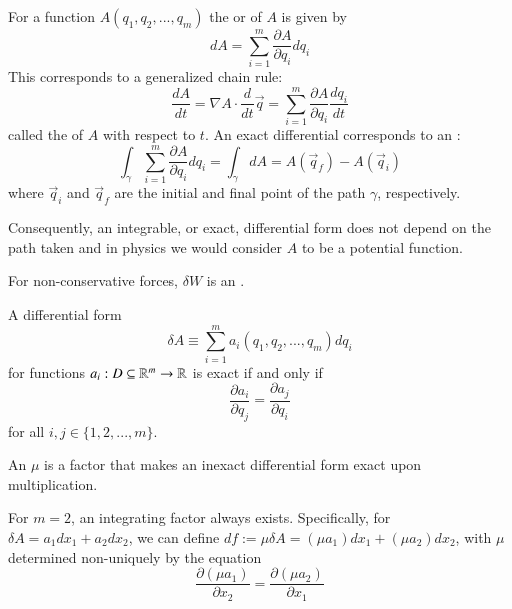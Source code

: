 \documentclass[12pt, a4paper, oneside, openright, titlepage]{book}
\begin{document}
\begin{defn}
    For a function $A(q_1,q_2,...,q_m)$ the  or  of $A$ is given by \begin{equation*}
        dA = \sum_{i=1}^m\frac{\partial A}{\partial q_i}dq_i
    \end{equation*}
    This corresponds to a generalized chain rule: \begin{equation*}
        \frac{dA}{dt} = \nabla A\cdot \frac{d}{dt}\vec{q} = \sum_{i=1}^m\frac{\partial A}{\partial q_i}\frac{dq_i}{dt}
    \end{equation*}
    called the  of $A$ with respect to $t$. An exact differential corresponds to an : \begin{equation*}
        \int_{\gamma}\sum_{i=1}^m\frac{\partial A}{\partial q_i}dq_i = \int_{\gamma}dA = A(\vec{q}_f) - A(\vec{q}_i)
    \end{equation*}
    where $\vec{q}_i$ and $\vec{q}_f$ are the initial and final point of the path $\gamma$, respectively.
\end{defn}

Consequently, an integrable, or exact, differential form does not depend on the path taken and in physics we would consider $A$ to be a potential function. 

\begin{note}
    For non-conservative forces, $\delta W$ is an .
\end{note}

\begin{thm}
    A differential form $$\delta A \equiv \sum_{i=1}^ma_i(q_1,q_2,...,q_m)dq_i$$ for functions $a_i:D \subseteq \mathbb R^m\rightarrow \mathbb R$ is exact if and only if \begin{equation*}
        \frac{\partial a_i}{\partial q_j} = \frac{\partial a_j}{\partial q_i}
    \end{equation*}
    for all $i,j \in \{1,2,...,m\}$.
\end{thm}

\begin{defn}
    An  $\mu$ is a factor that makes an inexact differential form exact upon multiplication.
\end{defn}

\begin{thm}
    For $m = 2$, an integrating factor always exists. Specifically, for $\delta A = a_1dx_1+a_2dx_2$, we can define $df:= \mu \delta A = (\mu a_1)dx_1 + (\mu a_2)dx_2$, with $\mu$ determined non-uniquely by the equation \begin{equation*}
        \frac{\partial (\mu a_1)}{\partial x_2} = \frac{\partial (\mu a_2)}{\partial x_1}
    \end{equation*}
\end{thm}
\end{document}

